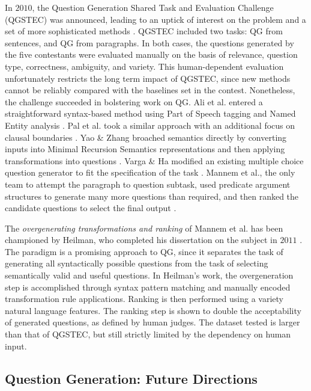 In $2010$, the Question Generation Shared Task and Evaluation Challenge (QGSTEC) was announced, leading to an uptick of interest on the problem and a set of more sophisticated methods  \citep{rus2011question}. QGSTEC included two tasks: QG from sentences, and QG from paragraphs. In both cases, the questions generated by the five contestants were evaluated manually on the basis of relevance, question type, correctness, ambiguity, and variety. This human-dependent evaluation unfortunately restricts the long term impact of QGSTEC, since new methods cannot be reliably compared with the baselines set in the contest. Nonetheless, the challenge succeeded in bolstering work on QG. Ali et al. entered a straightforward syntax-based method using Part of Speech tagging and Named Entity analysis  \citep{ali2010automatic}. Pal et al. took a similar approach with an additional focus on clausal boundaries  \citep{pal2010qgstec}. Yao \& Zhang broached semantics directly by converting inputs into Minimal Recursion Semantics representations and then applying transformations into questions  \citep{yao2010question}. Varga \& Ha modified an existing multiple choice question generator to fit the specification of the task  \citep{vargaha}. Mannem et al., the only team to attempt the paragraph to question subtask, used predicate argument structures to generate many more questions than required, and then ranked the candidate questions to select the final output  \citep{mannem2010question}. 

The \textit{overgenerating transformations and ranking} of Mannem et al. has been championed by Heilman, who completed his dissertation on the subject in $2011$  \citep{heilman2010extracting, heilman2010good, heilman2011automatic}. The paradigm is a promising approach to QG, since it separates the task of generating all syntactically possible questions from the task of selecting semantically valid and useful questions. In Heilman's work, the overgeneration step is accomplished through syntax pattern matching and manually encoded transformation rule applications. Ranking is then performed using a variety natural language features. The ranking step is shown to double the acceptability of generated questions, as defined by human judges. The dataset tested is larger than that of QGSTEC, but still strictly limited by the dependency on human input.

\subsection{Question Generation: Future Directions}

